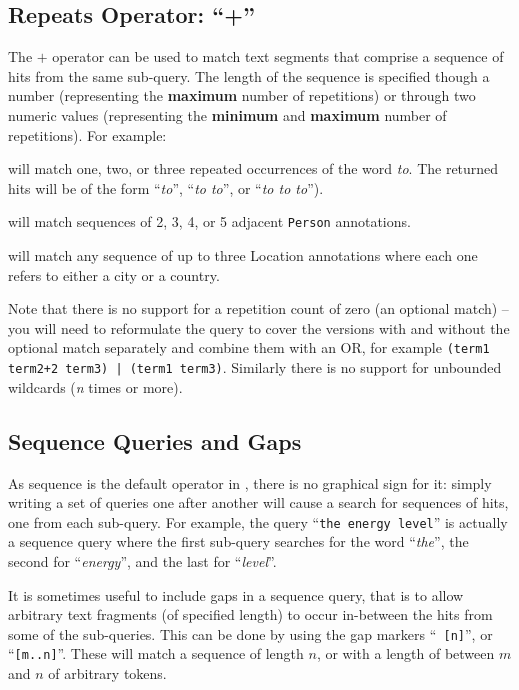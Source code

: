 \subsection{Repeats Operator: ``+''}\label{sec:kleene-query}

The $+$ operator can be used to match text segments that comprise a sequence of
hits from the same sub-query. The length of the sequence is specified though a
number (representing the {\bf maximum} number of repetitions) or through two
numeric values (representing the {\bf minimum} and {\bf maximum} number of
repetitions). For example:
\bde
  \item[{\tt to+3}] will match one, two, or three repeated occurrences of the
  word {\it to}. The returned hits will be of the form ``{\it to}'', ``{\it to  
  to}'', or ``{\it to to to}'').
  \item[{\tt \{Person\}+2..5}] will match sequences of 2, 3, 4, or 5
  adjacent {\tt Person} annotations.
  \item[{\tt (\{Location locType = city\} |
  \{Location locType = country\})+3}] will match any sequence of up to
  three Location annotations where each one refers to either a city or a
  country.
\ede

Note that there is no support for a repetition count of zero (an optional
match) -- you will need to reformulate the query to cover the versions with and
without the optional match separately and combine them with an OR, for example
{\tt (term1 term2+2 term3) | (term1 term3)}.  Similarly there is no support for
unbounded wildcards ({\em n} times or more).

\subsection{Sequence Queries and Gaps}\label{sec:sequence-query}

As sequence is the default operator in \Mimir, there is no graphical sign for
it: simply writing a set of queries one after another will cause a search for
sequences of hits, one from each sub-query. For example, the query ``{\tt the
energy level}'' is actually a sequence query where the first sub-query searches
for the word ``{\it the}'', the second for ``{\it energy}'', and the last for
``{\it level}''.

It is sometimes useful to include gaps in a sequence query, that is to allow
arbitrary text fragments (of specified length) to occur in-between the hits
from some of the sub-queries. This can be done by using the gap markers ``{\tt
[n]}'', or ``{\tt [m..n]}''. These will match a sequence of length $n$, or with
a length of between $m$ and $n$ of arbitrary tokens.

